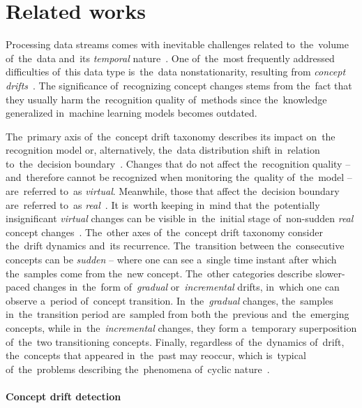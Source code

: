 \section{Related works}
\label{sec-related}

Processing data streams comes with inevitable challenges related to~the~volume of~the~data and~its \textit{temporal} nature~\cite{gama2010knowledge}. One of~the~most frequently addressed difficulties of~this data type is~the~data nonstationarity, resulting from \textit{concept drifts}~\cite{webb2016characterizing}. The significance of~recognizing concept changes stems from the~fact that they usually harm the~recognition quality of~methods since the~knowledge generalized in~machine learning models becomes outdated. 

The~primary axis of~the~concept drift taxonomy describes its impact on~the recognition model or, alternatively, the~data distribution shift in~relation to~the~decision boundary~\cite{gama2004learning}. Changes that do not affect the~recognition quality -- and~therefore cannot be recognized when monitoring the~quality of~the~model -- are~referred to~as \textit{virtual}. Meanwhile, those that affect the~decision boundary are~referred to~as \textit{real}~\cite{lobo2020spiking}. It is~worth keeping in~mind that the~potentially insignificant \textit{virtual} changes can be visible in~the~initial stage of~non-sudden \textit{real} concept changes~\cite{komorniczak2024structuring}. The~other axes of~the~concept drift taxonomy consider the~drift dynamics and~its recurrence. The~transition between the~consecutive concepts can be \textit{sudden} -- where one can see a~single time instant after which the~samples come from the~new concept. The~other categories describe slower-paced changes in~the~form of~\textit{gradual} or~\textit{incremental} drifts, in~which one can observe a~period of~concept transition. In~the~\textit{gradual} changes, the~samples in~the~transition period are~sampled from both the~previous and~the~emerging concepts, while in~the~\textit{incremental} changes, they form a~temporary superposition of~the~two transitioning concepts. Finally, regardless of~the~dynamics of~drift, the~concepts that appeared in~the~past may reoccur, which is~typical of~the~problems describing the~phenomena of~cyclic nature~\cite{gunasekara2024recurrent}.

\paragraph{Concept drift detection}


